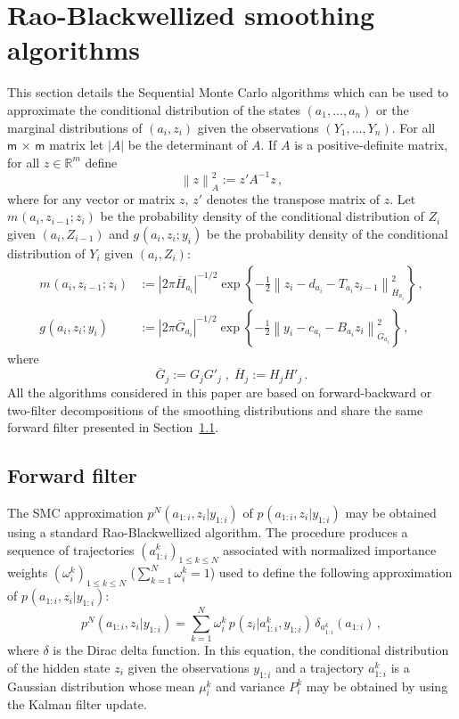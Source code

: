 \documentclass[nolayout]{article}
\theoremstyle{plain}
\theoremstyle{definition}
\newcommand{\1}{\mathbbm{1}}
\def\dimz{\mathsf{m}}
\def\barG{\overline{G}}
\def\barH{\overline{H}}
\def\eqsp{\,}
\newcommand{\normMat}[2]{\left\|#2\right\|_{#1}}
\newcommand{\eqdef}{\ensuremath{:=}}
\begin{document}
\section{Rao-Blackwellized smoothing algorithms}
\label{sec:RaoBlackwell}
This section details the Sequential Monte Carlo algorithms which can be used to approximate the conditional distribution of the states $(a_1,\ldots,a_n)$ or the marginal distributions of $(a_i,z_{i})$ given the observations $(Y_1,\ldots,Y_n)$. For all $\dimz\,\times\,\dimz$ matrix  let $|A|$ be the determinant of $A$. If $A$ is a positive-definite matrix, for all $z\in\mathbb{R}^{m}$ define
\[
\normMat{A}{z}^2 \eqdef z'A^{-1}z\eqsp,
\]
where for any vector or matrix $z$, $z'$ denotes the transpose matrix of $z$. Let $m_{}(a_{i},z_{i-1};z_i)$ be the probability density of the conditional distribution of $Z_i$ given $(a_{i},Z_{i-1})$ and $g_{}(a_{i},z_{i};y_i)$ be the probability density of the conditional distribution of $Y_i$ given $(a_{i},Z_{i})$:
\begin{align}
\label{eq:definition-m}
m_{}(a_{i},z_{i-1};z_i) & \eqdef \left|2\pi\barH_{a_i}\right|^{-1/2}\exp\left\{-\frac{1}{2}\normMat{\barH_{a_i}}{z_i -d_{a_{i}} -T_{a_{i}}z_{i-1}}^2\right\}\eqsp,\\
\label{eq:definition-g}
g_{}(a_{i},z_{i};y_i) & \eqdef \left|2\pi\barG_{a_i}\right|^{-1/2}\exp\left\{-\frac{1}{2}\normMat{\barG_{a_i}}{y_i - c_{a_i} - B_{a_i}z_{i}}^2\right\}\eqsp,
\end{align}
where
\[
\barG_j \eqdef G_jG'_j\;,\; \barH_{j} \eqdef H_jH'_j\eqsp.
\]
All the algorithms considered in this paper are based on forward-backward or two-filter decompositions of the smoothing distributions and share the same forward filter presented in Section~\ref{sec:forward}.

\subsection{Forward filter}
\label{sec:forward}
The SMC approximation $p^N_{}(a_{1:i},z_{i}|y_{1:i})$ of $p_{}(a_{1:i},z_{i}|y_{1:i})$ may be obtained using a standard Rao-Blackwellized  algorithm. The procedure produces a sequence of trajectories $(a^k_{1:i})_{1\le k \le N}$ associated with normalized importance weights $(\omega^k_{i})_{1\le k \le N}$ ($\sum_{k=1}^N \omega^k_i = 1$) used to define the following approximation of $p_{}(a_{1:i},z_{i}|y_{1:i})$:
\begin{equation}
\label{eq:forward:SMC}
p^N_{}(a_{1:i},z_{i}|y_{1:i}) = \sum_{k=1}^N\omega^k_{i}\,p_{}(z_{i}|a^k_{1:i},y_{1:i})\,\delta_{a^k_{1:i}}(a_{1:i})\eqsp,
\end{equation}
where $\delta$ is the Dirac delta function. In this equation, the conditional distribution of the hidden state $z_{i}$ given the observations $y_{1:i}$ and a trajectory $a^k_{1:i}$ is a Gaussian distribution whose mean $\mu^k_{i}$ and variance $P^k_{i}$ may be obtained by using the Kalman filter update.
\end{document}
